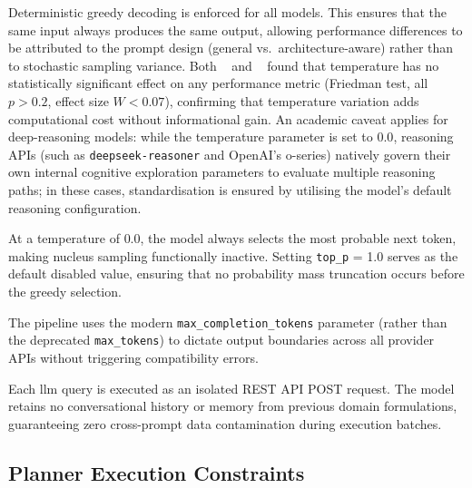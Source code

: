 \begin{description}[style=nextline, leftmargin=1.5cm]
  \item[\textbf{Temperature} ($T = 0.0$):]
    Deterministic greedy decoding is enforced for all models.
    This ensures that the same input always produces the same output, allowing performance differences to be attributed to the prompt design (general vs.\ architecture-aware) rather than to stochastic sampling variance.
    Both \citeauthor{Georgievski2025}~\cite{Georgievski2025} and \citeauthor{Elis2025}~\cite{Elis2025} found that temperature has no statistically significant effect on any performance metric (Friedman test, all $p > 0.2$, effect size $W < 0.07$), confirming that temperature variation adds computational cost without informational gain.
    An academic caveat applies for deep-reasoning models: while the temperature parameter is set to $0.0$, reasoning APIs (such as \texttt{deepseek-reasoner} and OpenAI's o-series) natively govern their own internal cognitive exploration parameters to evaluate multiple reasoning paths; in these cases, standardisation is ensured by utilising the model's default reasoning configuration.

  \item[\textbf{Top-$p$} (\texttt{top\_p} = 1.0):]
    At a temperature of $0.0$, the model always selects the most probable next token, making nucleus sampling functionally inactive.
    Setting \texttt{top\_p} = 1.0 serves as the default disabled value, ensuring that no probability mass truncation occurs before the greedy selection.

  \item[\textbf{Token generation limits} (\texttt{max\_completion\_tokens} = 8192):]
    The pipeline uses the modern \texttt{max\_completion\_tokens} parameter (rather than the deprecated \texttt{max\_tokens}) to dictate output boundaries across all provider APIs without triggering compatibility errors.

  \item[\textbf{Context memory} (Stateless):]
    Each \gls{llm} query is executed as an isolated REST API POST request.
    The model retains no conversational history or memory from previous domain formulations, guaranteeing zero cross-prompt data contamination during execution batches.
\end{description}

\subsection{Planner Execution Constraints}
\label{sec:setup:constraints}

